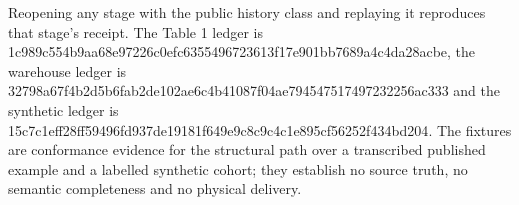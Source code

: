 Reopening any stage with the public history class and replaying it reproduces that stage's receipt. The Table 1 ledger is {\small\ttfamily 1c989c55\allowbreak{}4b9aa68e\allowbreak{}97226c0e\allowbreak{}fc635549\allowbreak{}6723613f\allowbreak{}17e901bb\allowbreak{}7689a4c4\allowbreak{}da28acbe}, the warehouse ledger is {\small\ttfamily 32798a67\allowbreak{}f4b2d5b6\allowbreak{}fab2de10\allowbreak{}2ae6c4b4\allowbreak{}1087f04a\allowbreak{}e7945475\allowbreak{}17497232\allowbreak{}256ac333} and the synthetic ledger is {\small\ttfamily 15c7c1ef\allowbreak{}f28ff594\allowbreak{}96fd937d\allowbreak{}e19181f6\allowbreak{}49e9c8c9\allowbreak{}c4c1e895\allowbreak{}cf56252f\allowbreak{}434bd204}. The fixtures are conformance evidence for the structural path over a transcribed published example and a labelled synthetic cohort; they establish no source truth, no semantic completeness and no physical delivery.

